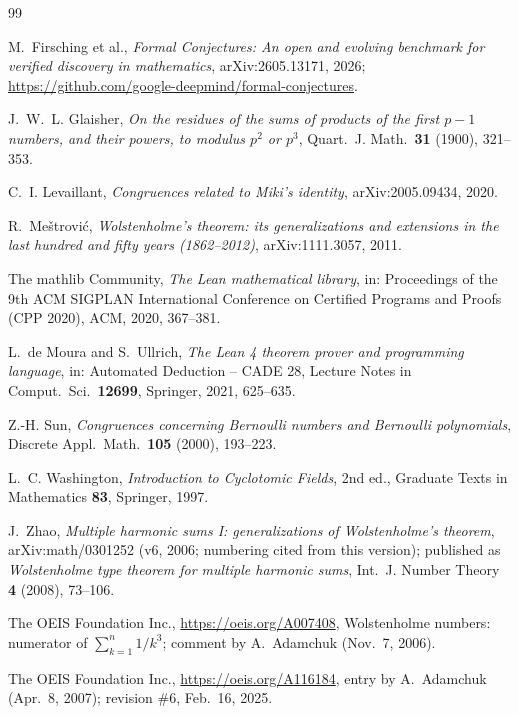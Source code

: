 \documentclass[11pt]{amsart}
\theoremstyle{plain}
\theoremstyle{definition}
\begin{document}
{\small
\begin{thebibliography}{99}

M.~Firsching et al., \emph{Formal Conjectures: An open and evolving benchmark for verified discovery in mathematics}, arXiv:2605.13171, 2026; \url{https://github.com/google-deepmind/formal-conjectures}.

J.~W.~L. Glaisher, \emph{On the residues of the sums of products of the first $p-1$ numbers, and their powers, to modulus $p^2$ or $p^3$}, Quart.\ J. Math.\ \textbf{31} (1900), 321--353.

C.~I. Levaillant, \emph{Congruences related to Miki's identity}, arXiv:2005.09434, 2020.

R.~Me\v{s}trovi\'c, \emph{Wolstenholme's theorem: its generalizations and extensions in the last hundred and fifty years (1862--2012)}, arXiv:1111.3057, 2011.

The mathlib Community, \emph{The Lean mathematical library}, in: Proceedings of the 9th ACM SIGPLAN International Conference on Certified Programs and Proofs (CPP 2020), ACM, 2020, 367--381.

L.~de Moura and S.~Ullrich, \emph{The Lean 4 theorem prover and programming language}, in: Automated Deduction -- CADE 28, Lecture Notes in Comput.\ Sci.\ \textbf{12699}, Springer, 2021, 625--635.

Z.-H. Sun, \emph{Congruences concerning Bernoulli numbers and Bernoulli polynomials}, Discrete Appl.\ Math.\ \textbf{105} (2000), 193--223.

L.~C. Washington, \emph{Introduction to Cyclotomic Fields}, 2nd ed., Graduate Texts in Mathematics \textbf{83}, Springer, 1997.

J.~Zhao, \emph{Multiple harmonic sums I: generalizations of Wolstenholme's theorem}, arXiv:math/0301252 (v6, 2006; numbering cited from this version); published as \emph{Wolstenholme type theorem for multiple harmonic sums}, Int.\ J. Number Theory \textbf{4} (2008), 73--106.

The OEIS Foundation Inc., \url{https://oeis.org/A007408}, Wolstenholme numbers: numerator of $\sum_{k=1}^{n}1/k^3$; comment by A.~Adamchuk (Nov.~7, 2006).

The OEIS Foundation Inc., \url{https://oeis.org/A116184}, entry by A.~Adamchuk (Apr.~8, 2007); revision \#6, Feb.~16, 2025.

\end{thebibliography}
}
\end{document}
